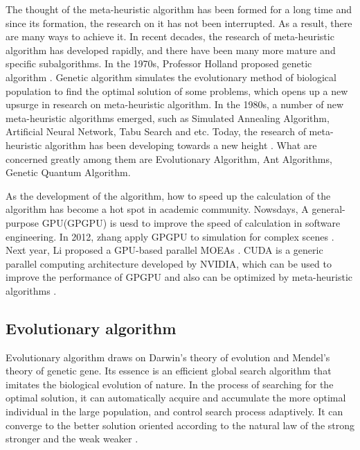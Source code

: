 The thought of the meta-heuristic algorithm has been formed for a long time 
and since its formation, the research on it has not been interrupted. As a 
result, there are many ways to achieve it. In recent decades, the research of 
meta-heuristic algorithm has developed rapidly, and there have been many more 
mature and specific subalgorithms. In the 1970s, Professor Holland proposed 
genetic algorithm \cite{holland}. Genetic algorithm simulates the 
evolutionary method of biological population to find the optimal solution of 
some problems, which opens up a new upsurge in research on meta-heuristic 
algorithm. In the 1980s, a number of new meta-heuristic algorithms emerged, 
such as Simulated Annealing Algorithm, Artificial Neural Network, Tabu Search 
and etc. Today, the research of meta-heuristic algorithm has been developing 
towards a new height \cite{harman}. What are concerned greatly among them are 
Evolutionary Algorithm, Ant Algorithms, Genetic Quantum Algorithm.

As the development of the algorithm, how to speed up the calculation of the algorithm
has become a hot spot in academic community. Nowsdays,  A general-purpose GPU(GPGPU) is uesd 
to improve the speed of calculation in software engineering. In 2012, zhang apply GPGPU to
simulation for complex scenes \cite{zhang}. Next year, Li proposed a GPU-based parallel MOEAs \cite{li}.
CUDA is a generic parallel computing architecture developed by NVIDIA, which can be used to improve
the performance of GPGPU \cite{langdon2} and also can be optimized by meta-heuristic algorithms \cite{langdon1}.




\subsection{Evolutionary algorithm}

Evolutionary algorithm draws on Darwin's theory of evolution and Mendel's 
theory of genetic gene. Its essence is an efficient global search algorithm 
that imitates the biological evolution of nature. In the process of searching 
for the optimal solution, it can automatically acquire and accumulate the 
more optimal individual in the large population, and control search process 
adaptively. It can converge to the better solution oriented according to the 
natural law of the strong stronger and the weak weaker \cite{deb}.


